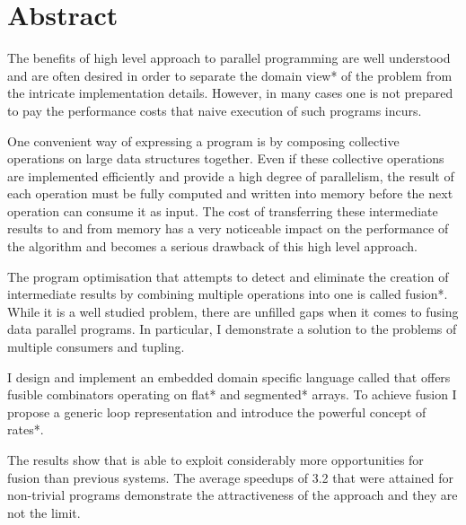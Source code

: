 \documentclass[preamble.tex]{subfiles}
\begin{document}
\clearpage

\chapter*{Abstract}

The benefits of high level approach to parallel programming are well understood and are often desired in order to separate the \*domain view* of the problem from the intricate implementation details. However, in many cases one is not prepared to pay the performance costs that naive execution of such programs incurs.

One convenient way of expressing a program is by composing collective operations on large data structures together. Even if these collective operations are implemented efficiently and provide a high degree of parallelism, the result of each operation must be fully computed and written into memory before the next operation can consume it as input. The cost of transferring these intermediate results to and from memory has a very noticeable impact on the performance of the algorithm and becomes a serious drawback of this high level approach.

The program optimisation that attempts to detect and eliminate the creation of intermediate results by combining multiple operations into one is called \*fusion*. While it is a well studied problem, there are unfilled gaps when it comes to fusing data parallel programs. In particular, I demonstrate a solution to the problems of multiple consumers and tupling.

I design and implement an embedded domain specific language called \LiveFusion that offers fusible combinators operating on \*flat* and \*segmented* arrays. To achieve fusion I propose a generic loop representation and introduce the powerful concept of \*rates*.

The results show that \LiveFusion is able to exploit considerably more opportunities for fusion than previous systems. The average speedups of 3.2 that were attained for non-trivial programs demonstrate the attractiveness of the approach and they are not the limit.


\end{document}
